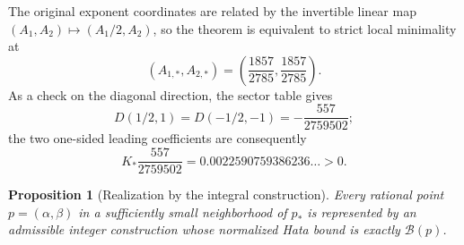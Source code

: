 \documentclass[11pt,reqno,letterpaper]{amsart}
\numberwithin{equation}{section}
\newtheorem{proposition}[theorem]{Proposition}
\theoremstyle{definition}
\theoremstyle{remark}
\begin{document}
The original exponent coordinates are related by the invertible linear
map \((A_1,A_2)\mapsto(A_1/2,A_2)\), so the theorem is equivalent to
strict local minimality at
\[
 (A_{1,*},A_{2,*})=
 \left(\frac{1857}{2785},\frac{1857}{2785}\right).
\]
As a check on the diagonal direction, the sector table gives
\[
 D(1/2,1)=D(-1/2,-1)=-\frac{557}{2759502};
\]
the two one-sided leading coefficients are consequently
\begin{equation}\label{eq:diagonal-leading-coefficient}
 K_*\frac{557}{2759502}
 =0.0022590759386236\ldots>0.
\end{equation}

\begin{proposition}[Realization by the integral construction]
\label{prop:rational-realization}
Every rational point \(p=(\alpha,\beta)\) in a sufficiently small
neighborhood of \(p_*\) is represented by an admissible integer
construction whose normalized Hata bound is exactly \(\mathcal B(p)\).
\end{proposition}
\end{document}
